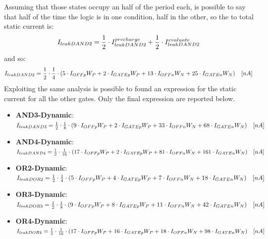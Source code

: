 \documentclass[12pt,  english, makeidx, a4paper, titlepage, oneside]{article}
\begin{document}
Assuming that those states occupy an half of the period each, is possible to say that half of the time the logic is in one condition, half in the other, so the to total static current is:
\begin{equation}
	I_{leakDAND2}={1 \over 2} \cdot I_{leakDAND2}^{precharge}+ {1 \over2} \cdot I_{leakDAND2}^{evaluate}
	\end{equation}
and so:
\begin{equation}
I_{leakDAND2}= {1 \over 2} \cdot {1 \over 4}\cdot(5 \cdot I_{OFFp}W_P+2 \cdot I_{GATEp}W_P+13 \cdot I_{OFFn}W_N+25 \cdot I_{GATEn}W_N)\quad [nA]
\end{equation}
Exploiting the same analysis is possible to found an expression for the static current for all the other gates.
Only the final expression are reported below.
\begin{itemize}
\item \textbf{AND3-Dynamic}:\\
 $I_{leakDAND3}= {1 \over 2} \cdot {1 \over 8}\cdot(9 \cdot I_{OFFp}W_P+2 \cdot I_{GATEp}W_P+33 \cdot I_{OFFn}W_N+68 \cdot I_{GATEn}W_N)\quad [nA]$


\item \textbf{AND4-Dynamic}:\\
 $I_{leakDAND4}= {1 \over 2} \cdot {1 \over 16}\cdot(17 \cdot I_{OFFp}W_P+2 \cdot I_{GATEp}W_P+81 \cdot I_{OFFn}W_N+161 \cdot I_{GATEn}W_N) \quad [nA]$


\item \textbf{OR2-Dynamic}:\\
 $I_{leakDOR2}= {1 \over 2} \cdot {1 \over 4}\cdot(5 \cdot I_{OFFp}W_P+4 \cdot I_{GATEp}W_P+7 \cdot I_{OFFn}W_N+18 \cdot I_{GATEn}W_N) \quad [nA]$


\item \textbf{OR3-Dynamic}:\\
 $I_{leakDOR3}= {1 \over 2} \cdot {1 \over 8}\cdot(9 \cdot I_{OFFp}W_P+8 \cdot I_{GATEp}W_P+11 \cdot I_{OFFn}W_N+42 \cdot I_{GATEn}W_N) \quad [nA]$


\item \textbf{OR4-Dynamic}:\\
 $I_{leakDOR4}= {1 \over 2} \cdot {1 \over 16}\cdot(17 \cdot I_{OFFp}W_P+16 \cdot I_{GATEp}W_P+18 \cdot I_{OFFn}W_N+98 \cdot I_{GATEn}W_N) \quad [nA]$


\end{itemize}
\newpage
\end{document}
